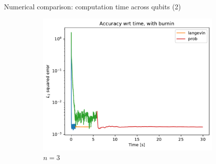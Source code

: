 \documentclass{beamer}
\begin{document}
\begin{frame}{Numerical comparison: computation time across qubits (2)}
    
    \begin{figure}[H]

        \centering
    
        \begin{subfigure}[b]{0.4\textwidth}
    
    
            \centering
    
            \includegraphics[width=\textwidth]{figures/experiments/baseline/diff_n_qubits/iters_acc_comp_time_no_avg-1.png}
    
            \caption{$n=3$}
    
            \label{fig:conv-plot-diff-n-3-sub}
    
        \end{subfigure}
        \hfill
        \begin{subfigure}[b]{0.4\textwidth}
    
    
            \centering
    

\end{subfigure}
\end{figure}
\end{frame}
\end{document}
